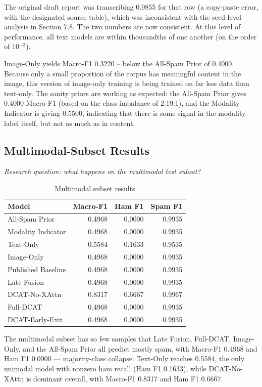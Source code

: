 \documentclass[10pt,twoside]{article}
\begin{document}
The original draft report was transcribing 0.9855 for that row (a copy-paste error, with the designated source table), which was inconsistent with the seed-level analysis in Section 7.8. The two numbers are now consistent. At this level of performance, all text models are within thousandths of one another (on the order of 10$^{-3}$).

Image-Only yields Macro-F1 0.3220 -- below the All-Spam Prior of 0.4000. Because only a small proportion of the corpus has meaningful content in the image, this version of image-only training is being trained on far less data than text-only. The sanity priors are working as expected: the All-Spam Prior gives 0.4000 Macro-F1 (based on the class imbalance of 2.19:1), and the Modality Indicator is giving 0.5500, indicating that there is some signal in the modality label itself, but not as much as in content.

\subsection{Multimodal-Subset Results}\label{sec:7.2}

\emph{Research question: what happens on the multimodal test subset?}

\begin{table}[t]
\centering
\caption{Multimodal subset results}
\label{tab:mm}
\small
\begin{tabular}{lrrr}\toprule
Model & Macro-F1 & Ham F1 & Spam F1 \\
\midrule
All-Spam Prior & 0.4968 & 0.0000 & 0.9935 \\
Modality Indicator & 0.4968 & 0.0000 & 0.9935 \\
Text-Only & 0.5584 & 0.1633 & 0.9535 \\
Image-Only & 0.4968 & 0.0000 & 0.9935 \\
Published Baseline & 0.4968 & 0.0000 & 0.9935 \\
Late Fusion & 0.4968 & 0.0000 & 0.9935 \\
DCAT-No-XAttn & 0.8317 & 0.6667 & 0.9967 \\
Full-DCAT & 0.4968 & 0.0000 & 0.9935 \\
DCAT-Early-Exit & 0.4968 & 0.0000 & 0.9935 \\
\bottomrule
\end{tabular}

\end{table}

The multimodal subset has so few samples that Late Fusion, Full-DCAT, Image-Only, and the All-Spam Prior all predict mostly spam, with Macro-F1 0.4968 and Ham F1 0.0000 --- majority-class collapse. Text-Only reaches 0.5584, the only unimodal model with nonzero ham recall (Ham F1 0.1633), while DCAT-No-XAttn is dominant overall, with Macro-F1 0.8317 and Ham F1 0.6667.
\end{document}
